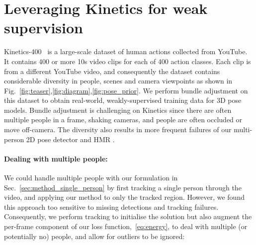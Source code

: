\documentclass[10pt,twocolumn,letterpaper]{article}
\begin{document}
 \section{Leveraging Kinetics for weak supervision}
\label{sec:kinetics_training}

Kinetics-400~\cite{kay_arxiv_2017} is a large-scale dataset of human actions collected from YouTube. It contains 400 or more 10s video clips for each of 400 action classes. Each clip is from a different YouTube video, and consequently the dataset contains considerable diversity in people, scenes and camera viewpoints as shown in Fig.~\ref{fig:teaser},\ref{fig:diagram},\ref{fig:pose_prior}. We perform bundle adjustment on this dataset to obtain real-world, weakly-supervised training data for 3D pose models.
Bundle adjustment is challenging on Kinetics since there are often multiple people in a frame, shaking cameras, and people are often occluded or move off-camera.
The diversity also results in more frequent failures of our multi-person 2D pose detector \cite{papandreou_cvpr_2017} and HMR \cite{kanazawa_cvpr_2018}.

\paragraph{Dealing with multiple people:}
We could handle multiple people with our formulation in Sec.~\ref{sec:method_single_person} by first tracking a single person through the video, and applying our method to only the tracked region.
However, we found this approach too sensitive to missing detections and tracking failures.
Consequently, we perform tracking to initialise the solution but also augment the per-frame component of our loss function,~\eqref{eq:energy}, to deal with multiple (or potentially no) people, and allow for outliers to be ignored:

\vspace{-\baselineskip}
\end{document}
